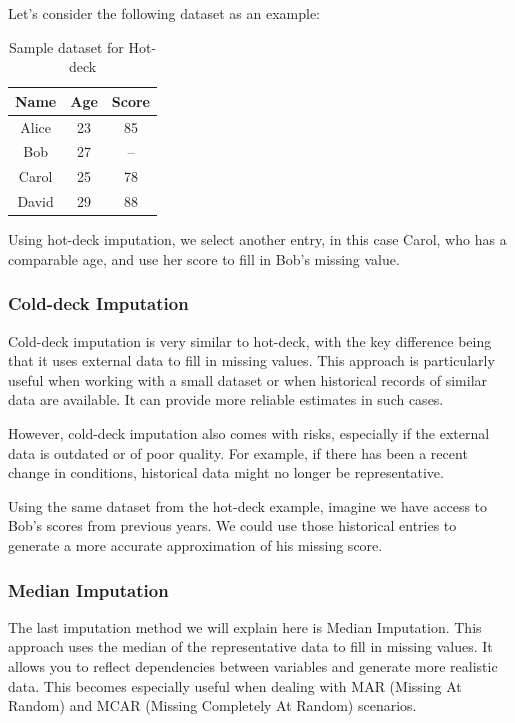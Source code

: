\documentclass[a4paper,12pt]{article}
\begin{document}
Let’s consider the following dataset as an example:

\begin{table}[h]
\centering
\begin{tabular}{|c|c|c|}
\hline
\textbf{Name} & \textbf{Age} & \textbf{Score} \\
\hline
Alice & 23 & 85 \\
\hline
Bob & 27 & -- \\
\hline
Carol & 25 & 78 \\
\hline
David & 29 & 88 \\
\hline
\end{tabular}
\caption{Sample dataset for Hot-deck}
\label{tab:sample_data}
\end{table}

Using hot-deck imputation, we select another entry, in this case Carol, who has a comparable age, and use her score to fill in Bob’s missing value.

\subsubsection{Cold-deck Imputation}

Cold-deck imputation is very similar to hot-deck, with the key difference being that it uses external data to fill in missing values. This approach is particularly useful when working with a small dataset or when historical records of similar data are available. It can provide more reliable estimates in such cases. 

However, cold-deck imputation also comes with risks, especially if the external data is outdated or of poor quality. For example, if there has been a recent change in conditions, historical data might no longer be representative. 

Using the same dataset from the hot-deck example, imagine we have access to Bob’s scores from previous years. We could use those historical entries to generate a more accurate approximation of his missing score.

\subsubsection{Median Imputation}

The last imputation method we will explain here is Median Imputation. This approach uses the median of the representative data to fill in missing values. It allows you to reflect dependencies between variables and generate more realistic data. This becomes especially useful when dealing with MAR (Missing At Random) and MCAR (Missing Completely At Random) scenarios.\\
\end{document}
